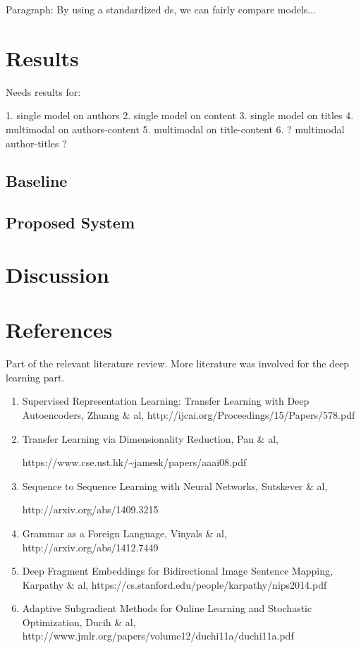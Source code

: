\documentclass[12pt]{article}
\begin{document}
Paragraph: By using a standardized ds, we can fairly compare models...


\section{Results}\label{results}

Needs results for:

1. single model on authors
2. single model on content
3. single model on titles
4. multimodal on authors-content
5. multimodal on title-content
6. ? multimodal author-titles ?

\subsection{Baseline}
\subsection{Proposed System}


\section{Discussion}\label{discussion}

\section{References}\label{References}

Part of the relevant literature review. More literature was involved for
the deep learning part.

\begin{enumerate}
\def\labelenumi{\arabic{enumi}.}
\item
  Supervised Representation Learning: Transfer Learning with Deep
  Autoencoders, Zhuang \& al,
  http://ijcai.org/Proceedings/15/Papers/578.pdf
\item
  Transfer Learning via Dimensionality Reduction, Pan \& al,

  https://www.cse.ust.hk/\textasciitilde{}jamesk/papers/aaai08.pdf
\item
  Sequence to Sequence Learning with Neural Networks, Sutskever \& al,

  http://arxiv.org/abs/1409.3215
\item
  Grammar as a Foreign Language, Vinyals \& al,
  http://arxiv.org/abs/1412.7449
\item
  Deep Fragment Embeddings for Bidirectional Image Sentence Mapping,
  Karpathy \& al, https://cs.stanford.edu/people/karpathy/nips2014.pdf

\item Adaptive Subgradient Methods for Online Learning and Stochastic Optimization, Ducih \& al, http://www.jmlr.org/papers/volume12/duchi11a/duchi11a.pdf
\end{enumerate}

\end{document}
